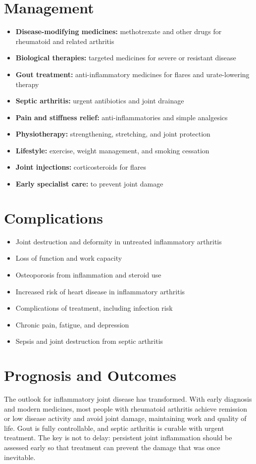 \section*{Management}
\begin{itemize}
    \item \textbf{Disease-modifying medicines:} methotrexate and other drugs for rheumatoid and related arthritis
    \item \textbf{Biological therapies:} targeted medicines for severe or resistant disease
    \item \textbf{Gout treatment:} anti-inflammatory medicines for flares and urate-lowering therapy
    \item \textbf{Septic arthritis:} urgent antibiotics and joint drainage
    \item \textbf{Pain and stiffness relief:} anti-inflammatories and simple analgesics
    \item \textbf{Physiotherapy:} strengthening, stretching, and joint protection
    \item \textbf{Lifestyle:} exercise, weight management, and smoking cessation
    \item \textbf{Joint injections:} corticosteroids for flares
    \item \textbf{Early specialist care:} to prevent joint damage
\end{itemize}

\section*{Complications}
\begin{itemize}
    \item Joint destruction and deformity in untreated inflammatory arthritis
    \item Loss of function and work capacity
    \item Osteoporosis from inflammation and steroid use
    \item Increased risk of heart disease in inflammatory arthritis
    \item Complications of treatment, including infection risk
    \item Chronic pain, fatigue, and depression
    \item Sepsis and joint destruction from septic arthritis
\end{itemize}

\section*{Prognosis and Outcomes}
The outlook for inflammatory joint disease has transformed. With early diagnosis and modern medicines, most people with rheumatoid arthritis achieve remission or low disease activity and avoid joint damage, maintaining work and quality of life. Gout is fully controllable, and septic arthritis is curable with urgent treatment. The key is not to delay: persistent joint inflammation should be assessed early so that treatment can prevent the damage that was once inevitable.

